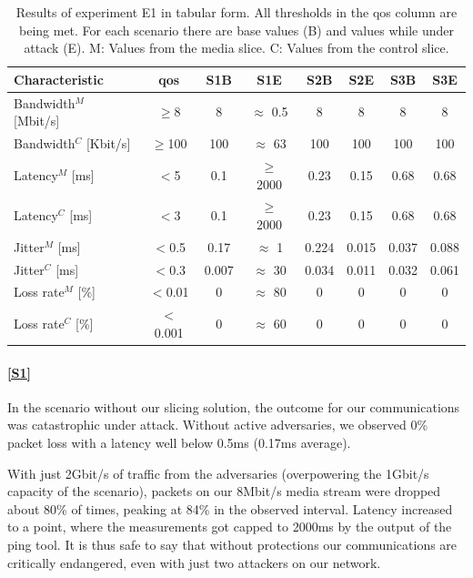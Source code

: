 \begin{description}[style=multiline, labelwidth=0.7cm]
    \begin{table}[ht]
        \centering
        \begin{tabular}{|l|c|c|c|c|c|c|c|}
             \hline
             \textbf{Characteristic} & \textbf{\acrshort{qos}} & \textbf{S1B} & \textbf{S1E} & \textbf{S2B} & \textbf{S2E} & \textbf{S3B} & \textbf{S3E} \\
             \hline
             Bandwidth$^M$ [Mbit/s] & $\geq$8 & 8 & $\approx$ 0.5 & 8 & 8 & 8 & 8 \\
             Bandwidth$^C$ [Kbit/s] & $\geq$100 & 100 & $\approx$ 63 & 100 & 100 & 100 & 100 \\
             \hline
             Latency$^M$ [ms] & $<$5 & 0.1 & $\geq$ 2000 & 0.23 & 0.15 & 0.68 & 0.68 \\
             Latency$^C$ [ms] & $<$3 & 0.1 & $\geq$ 2000 & 0.23 & 0.15 & 0.68 & 0.68 \\
             \hline
             Jitter$^M$ [ms] & $<$0.5 & 0.17 & $\approx$ 1 & 0.224 & 0.015 & 0.037 & 0.088 \\
             Jitter$^C$ [ms] & $<$0.3 & 0.007 & $\approx$ 30 & 0.034 & 0.011 & 0.032 & 0.061 \\
             \hline
             Loss rate$^M$ [\%] & $<$0.01 & 0 & $\approx$ 80 & 0 & 0 & 0 & 0 \\
             Loss rate$^C$ [\%] & $<$0.001 & 0 & $\approx$ 60 & 0 & 0 & 0 & 0 \\
             \hline
        \end{tabular}
        \caption[Results of experiment E1]{Results of experiment E1 in tabular form. All thresholds in the \acrshort{qos} column are being met. For each scenario there are base values (B) and values while under attack (E). M: Values from the media slice. C: Values from the control slice.}
        \label{table:validation_qos_results}
    \end{table}

    \paragraph{\ref{S1}} In the scenario without our slicing solution, the outcome for our communications was catastrophic under attack. Without active adversaries, we observed 0\% packet loss with a latency well below 0.5ms (0.17ms average).

    With just 2Gbit/s of traffic from the adversaries (overpowering the 1Gbit/s capacity of the scenario), packets on our 8Mbit/s media stream were dropped about 80\% of times, peaking at 84\% in the observed interval. Latency increased to a point, where the measurements got capped to 2000ms by the output of the ping tool. It is thus safe to say that without protections our communications are critically endangered, even with just two attackers on our network.


\end{description}
